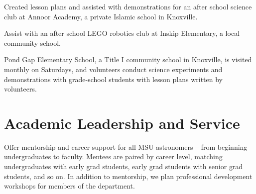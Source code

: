 \documentclass[letterpaper]{deedy-resume} %
\begin{document}

Created lesson plans and assisted with demonstrations for an after school science club at Annoor Academy, a private Islamic school in Knoxville.
\sectionspace %



Assist with an after school LEGO robotics club at Inskip Elementary, a local community school.
\sectionspace %



Pond Gap Elementary School, a Title I community school in Knoxville, is visited monthly on Saturdays, and volunteers conduct science experiments and demonstrations with grade-school students with lesson plans written by volunteers.
\sectionspace %



\section{Academic Leadership and Service}

\protected{}
Offer mentorship and career support for all MSU astronomers -- from beginning undergraduates to faculty. Mentees are paired by career level, matching undergraduates with early grad students,
early grad students with senior grad students, and so on. In addition to mentorship, we plan professional development workshops for members of the department.
\sectionspace %

\end{document}
